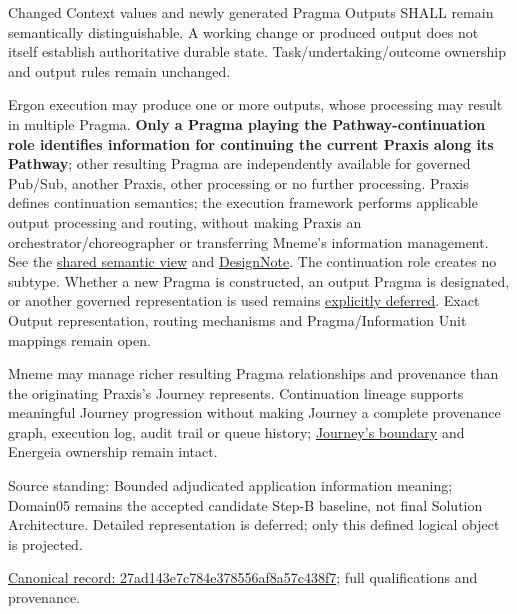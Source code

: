 Changed Context values and newly generated Pragma Outputs SHALL remain
semantically distinguishable. A working change or produced output does not
itself establish authoritative durable state. Task/undertaking/outcome ownership
and output rules remain unchanged.



Ergon execution may produce one or more outputs, whose processing may result in
multiple Pragma. \textbf{Only a Pragma playing the Pathway-continuation role identifies
information for continuing the current Praxis along its Pathway}; other resulting
Pragma are independently available for governed Pub/Sub, another Praxis, other
processing or no further processing. Praxis defines continuation semantics;
the execution framework performs applicable output processing and routing,
without making Praxis an orchestrator/choreographer or transferring Mneme's
information management. See the \hyperref[element:27ad143e7c784e378556af8a57c438f7]{shared semantic view}
and \href{\detokenize{../../../../../../../../../docs/markdown/05-information-systems-architecture/design-notes/DesignNote-Pragma-Outputs-and-Pathway-Continuation.md}}{DesignNote}.
The continuation role creates no subtype. Whether a new Pragma is constructed,
an output Pragma is designated, or another governed representation is used remains
\href{\detokenize{../../../../../../../../../docs/markdown/05-information-systems-architecture/gaps.md#continuation-representation}}{explicitly deferred}. Exact Output
representation, routing mechanisms and Pragma/Information Unit mappings remain open.



Mneme may manage richer resulting Pragma relationships and provenance than the
originating Praxis's Journey represents. Continuation lineage supports meaningful
Journey progression without making Journey a complete provenance graph, execution
log, audit trail or queue history; \hyperref[element:359b901df27f4b43b5a2ff14a8484e34]{Journey's boundary}
and Energeia ownership remain intact.



Source standing: Bounded adjudicated application information meaning; Domain05 remains the accepted candidate Step-B baseline, not final Solution Architecture. Detailed representation is deferred; only this defined logical object is projected.


{\footnotesize \href{../../../../../../../../continuum/application/data-object/27ad143e7c784e378556af8a57c438f7.md}{Canonical record: 27ad143e7c784e378556af8a57c438f7}; full qualifications and provenance.}\par
